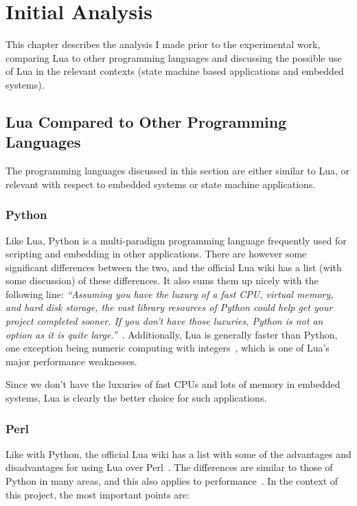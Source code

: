 \chapter{Initial Analysis}
\label{ch:initial_analysis}
This chapter describes the analysis I made prior to the experimental work, comparing Lua to other programming languages and discussing the possible use of Lua in the relevant contexts (state machine based applications and embedded systems).

\section{Lua Compared to Other Programming Languages}
\label{sec:lua_compared}
The programming languages discussed in this section are either similar to Lua, or relevant with respect to embedded systems or state machine applications.

\subsection{Python}
\label{sec:lua_vs_python}
Like Lua, Python is a multi-paradigm programming language frequently used for scripting and embedding in other applications. There are however some significant differences between the two, and the official Lua wiki has a list (with some discussion) of these differences. It also sums them up nicely with the following line: \emph{``Assuming you have the luxury of a fast CPU, virtual memory, and hard disk storage, the vast library resources of Python could help get your project completed sooner. If you don't have those luxuries, Python is not an option as it is quite large.''}~\cite{website:lua_wiki_python}. Additionally, Lua is generally faster than Python, one exception being numeric computing with integers~\cite{website:lua_perl_python_vs}, which is one of Lua's major performance weaknesses.

Since we don't have the luxuries of fast CPUs and lots of memory in embedded systems, Lua is clearly the better choice for such applications.

\subsection{Perl}
\label{sec:lua_vs_perl}
Like with Python, the official Lua wiki has a list with some of the advantages and disadvantages for using Lua over Perl~\cite{website:lua_wiki_perl}. The differences are similar to those of Python in many areas, and this also applies to performance~\cite{website:lua_perl_python_vs}. In the context of this project, the most important points are:

